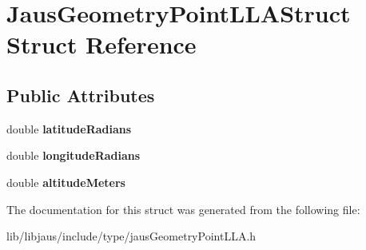 \hypertarget{struct_jaus_geometry_point_l_l_a_struct}{\section{\-Jaus\-Geometry\-Point\-L\-L\-A\-Struct \-Struct \-Reference}
\label{struct_jaus_geometry_point_l_l_a_struct}
}
\subsection*{\-Public \-Attributes}
\begin{DoxyCompactItemize}
\item 
\hypertarget{struct_jaus_geometry_point_l_l_a_struct_adf64a6dd1d97bc7f51fde0224d6c4c2e}{double {\bfseries latitude\-Radians}}\label{struct_jaus_geometry_point_l_l_a_struct_adf64a6dd1d97bc7f51fde0224d6c4c2e}

\item 
\hypertarget{struct_jaus_geometry_point_l_l_a_struct_aadeaf52a3efc6ac093f4d2fcd8c8b4f1}{double {\bfseries longitude\-Radians}}\label{struct_jaus_geometry_point_l_l_a_struct_aadeaf52a3efc6ac093f4d2fcd8c8b4f1}

\item 
\hypertarget{struct_jaus_geometry_point_l_l_a_struct_aea1042fcbcd0504b139fd2315dd60793}{double {\bfseries altitude\-Meters}}\label{struct_jaus_geometry_point_l_l_a_struct_aea1042fcbcd0504b139fd2315dd60793}

\end{DoxyCompactItemize}


\-The documentation for this struct was generated from the following file\-:\begin{DoxyCompactItemize}
\item 
lib/libjaus/include/type/jaus\-Geometry\-Point\-L\-L\-A.\-h\end{DoxyCompactItemize}
